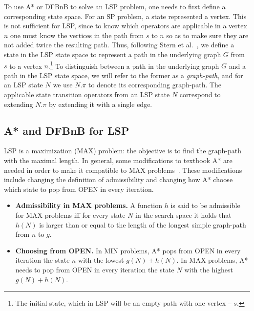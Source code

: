 \documentclass[letterpaper]{article} %
\newcommand\Roni[1]{\nb{\textbf{Roni:}}{blue}{#1}}
\begin{document}
To use A* or DFBnB to solve an LSP problem, one needs to first define a corresponding state space. For an SP problem, a state represented a vertex. This is not sufficient for LSP, since to know which operators are applicable in a vertex $n$ one must know the vertices in the path from $s$ to $n$ so as to make sure they are not added twice the resulting path.
Thus,
following Stern et al.~, we define a state in the LSP state space to represent a path in the underlying graph $G$ from $s$ to a vertex $n$.\footnote{The initial state, which in LSP will be an empty path with one vertex -- $s$.}
To distinguish between a path in the underlying graph $G$ and a path in the LSP state space,  we will refer to the former as a \emph{graph-path}, and for an LSP state $N$
we use $N.\pi$ to denote its corresponding graph-path.
The applicable state transition operators from an LSP state $N$ correspond to extending
$N.\pi$ by extending it with a single edge.


\subsection{A* and DFBnB for LSP}
LSP is a maximization (MAX) problem: the objective is to find the graph-path with the  maximal length. In general, some modifications to textbook A* are needed in order to make it compatible to MAX problems~\cite{DBLP:conf/socs/SternKPFR14}. These modifications include changing the definition of admissibility and changing how A* choose which state to pop from OPEN in every iteration.
\begin{itemize}
    \item \textbf{Admissibility in MAX problems.} A function $h$ is said to be admissible for MAX problems iff for every state $N$ in the search space it holds that $h(N)$ is larger than or equal to the length of the longest simple graph-path from $n$ to $g$.
    \item \textbf{Choosing from OPEN.} In MIN problems, A* pops from OPEN in every iteration the state $n$ with the lowest $g(N)+h(N)$. In MAX problems, A* needs to pop from OPEN in every iteration the state $N$ with the highest $g(N)+h(N)$.
\end{itemize}
\end{document}
